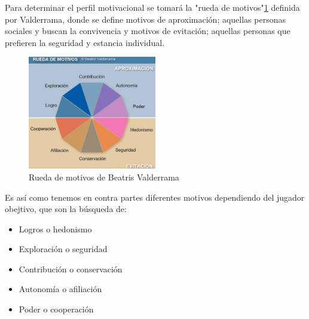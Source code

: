 Para determinar el perfil motivacional se tomará la "rueda de motivos"\ref{fig:rm} definida por Valderrama\cite{valde}, donde se define motivos de aproximación; aquellas personas sociales y buscan la convivencia y motivos de evitación; aquellas personas que prefieren la seguridad y estancia individual.
\begin{figure}
	\centering
	\caption{Rueda de motivos de Beatris Valderrama}
	\label{fig:rm}
	\includegraphics[width=0.5\textwidth]{02Antecedentes/contribucionesR/imagenes/rueda-de-motivos}
\end{figure}

Es así como tenemos en contra partes diferentes motivos dependiendo del jugador obejtivo, que son la búsqueda de:
\begin{itemize}
	\item Logros o hedonismo
	\item Exploración o seguridad
	\item Contribución o conservación
	\item Autonomía o afiliación
	\item Poder o cooperación
\end{itemize}
 